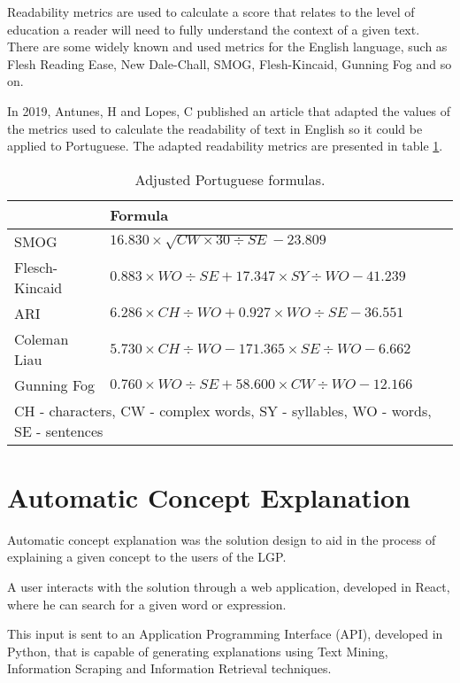 \documentclass[runningheads]{llncs}
\begin{document}
Readability metrics are used to calculate a score that relates to the level of education a reader will need to fully understand the context of a given text.
There are some widely known and used metrics for the English language, such as Flesh Reading Ease, New Dale-Chall, SMOG, Flesh-Kincaid, Gunning Fog and so on.

In 2019, Antunes, H and Lopes, C published an article \cite{ptread_2019} that adapted the values of the metrics used to calculate the readability of text in English so it could be applied to Portuguese.
The adapted readability metrics are presented in table \ref{table:ptformulas}.

\begin{table}
    \caption{Adjusted Portuguese formulas.}
    \label{table:ptformulas}
    \begin{tabular}{l|l}
        \hline
        {} & {\bfseries Formula} \\
        \hline
        SMOG & \(16.830 \times \sqrt{CW \times 30 \div SE} - 23.809\)  \\
        \hline
        Flesch-Kincaid & \(0.883 \times WO \div SE + 17.347 \times SY \div WO - 41.239\) \\
        \hline
        ARI & \(6.286 \times CH \div WO + 0.927 \times WO \div SE - 36.551\) \\
        \hline
        Coleman Liau & \(5.730 \times CH \div WO - 171.365 \times SE \div WO - 6.662\) \\
        \hline
        Gunning Fog & \(0.760 \times WO \div SE + 58.600 \times CW \div WO - 12.166\) \\
        \hline
        \multicolumn{2}{l}{CH - characters, CW - complex words, SY - syllables, WO - words, SE - sentences}
    \end{tabular}
\end{table}

\section{Automatic Concept Explanation}

Automatic concept explanation was the solution design to aid in the process of explaining a given concept to the users of the LGP.

A user interacts with the solution through a web application, developed in React, where he can search for a given word or expression.

This input is sent to an Application Programming Interface (API), developed in Python, that is capable of generating explanations using Text Mining, Information Scraping and Information Retrieval techniques.
\end{document}
